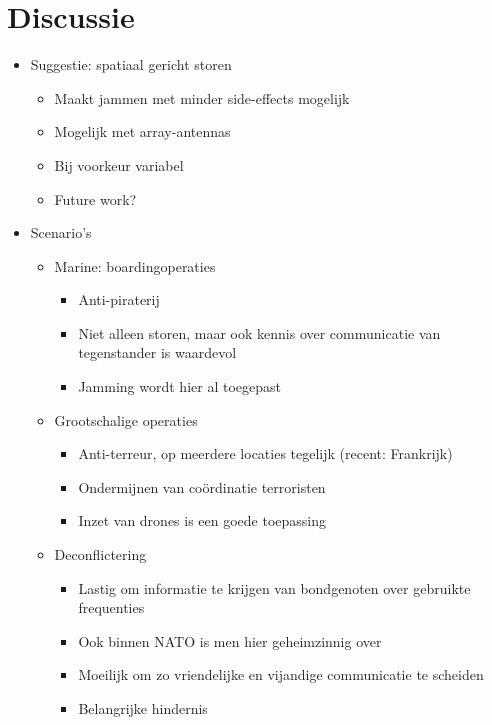 \documentclass[12pt, a4paper]{article}
\begin{document}
\section{Discussie}
\begin{itemize}
    \item Suggestie: spatiaal gericht storen
    \begin{itemize}
        \item Maakt jammen met minder side-effects mogelijk
        \item Mogelijk met array-antennas
        \item Bij voorkeur variabel
        \item Future work?
    \end{itemize}

    \item Scenario's
    \begin{itemize}
        \item Marine: boardingoperaties
        \begin{itemize}
            \item Anti-piraterij
            \item Niet alleen storen, maar ook kennis over communicatie van tegenstander is waardevol
            \item Jamming wordt hier al toegepast
        \end{itemize}

        \item Grootschalige operaties
        \begin{itemize}
            \item Anti-terreur, op meerdere locaties tegelijk (recent: Frankrijk)
            \item Ondermijnen van coördinatie terroristen
            \item Inzet van drones is een goede toepassing
        \end{itemize}

        \item Deconflictering
        \begin{itemize}
            \item Lastig om informatie te krijgen van bondgenoten over gebruikte frequenties
            \item Ook binnen NATO is men hier geheimzinnig over
            \item Moeilijk om zo vriendelijke en vijandige communicatie te scheiden
            \item Belangrijke hindernis
        \end{itemize}


\end{itemize}
\end{itemize}
\end{document}
